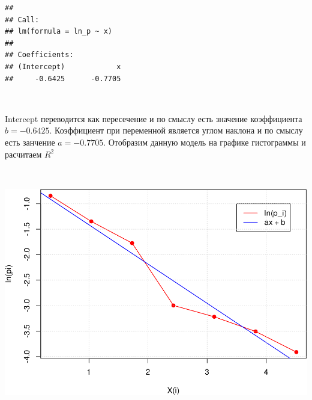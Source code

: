 \documentclass[
  14,
]{article}
\newenvironment{Shaded}{\begin{snugshade}}{\end{snugshade}}
\newcommand{\CommentTok}[1]{\textcolor[rgb]{0.56,0.35,0.01}{\textit{#1}}}
\newcommand{\DecValTok}[1]{\textcolor[rgb]{0.00,0.00,0.81}{#1}}
\newcommand{\FunctionTok}[1]{\textcolor[rgb]{0.00,0.00,0.00}{#1}}
\newcommand{\NormalTok}[1]{#1}
\newcommand{\OtherTok}[1]{\textcolor[rgb]{0.56,0.35,0.01}{#1}}
\newcommand{\SpecialCharTok}[1]{\textcolor[rgb]{0.00,0.00,0.00}{#1}}
\begin{document}
\begin{Shaded}
\end{Shaded}

\begin{verbatim}
## 
## Call:
## lm(formula = ln_p ~ x)
## 
## Coefficients:
## (Intercept)            x  
##     -0.6425      -0.7705
\end{verbatim}

\(\ \)

Intercept переводится как пересечение и по смыслу есть значение
коэффициента \(b = -0.6425\). Коэффициент при переменной является углом
наклона и по смыслу есть занчение \(a = -0.7705\). Отобразим данную
модель на графике гистограммы и расчитаем \(R^2\)

\(\ \)

\begin{center}\includegraphics[width=0.75\linewidth]{Prac3_files/figure-latex/unnamed-chunk-29-1} \end{center}
\end{document}
